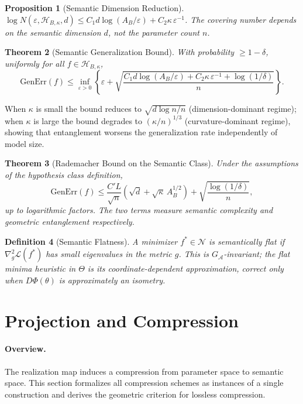 \documentclass[twocolumn,10pt]{article}
\theoremstyle{thmstyle}
\newtheorem{theorem}{Theorem}[section]
\newtheorem{proposition}[theorem]{Proposition}
\theoremstyle{defstyle}
\newtheorem{definition}[theorem]{Definition}
\begin{document}
\begin{proposition}[Semantic Dimension Reduction]
$\log N(\varepsilon,\mathcal{H}_{B,\kappa},d) \leq
C_1 d\log(A_B/\varepsilon) + C_2\kappa\,\varepsilon^{-1}$.
The covering number depends on the semantic dimension $d$, not the
parameter count $n$.
\end{proposition}

\begin{theorem}[Semantic Generalization Bound]
With probability $\geq 1-\delta$, uniformly for all
$f \in \mathcal{H}_{B,\kappa}$,
\[
\mathrm{GenErr}(f) \leq \inf_{\varepsilon>0}\!\left\{
\varepsilon + \sqrt{\frac{C_1 d\log(A_B/\varepsilon)
+ C_2\kappa\,\varepsilon^{-1} + \log(1/\delta)}{n}}
\right\}.
\]
\end{theorem}

When $\kappa$ is small the bound reduces to $\sqrt{d\log n/n}$
(dimension-dominant regime); when $\kappa$ is large the bound degrades
to $(\kappa/n)^{1/3}$ (curvature-dominant regime), showing that
entanglement worsens the generalization rate independently of model
size.

\begin{theorem}[Rademacher Bound on the Semantic Class]
Under the assumptions of the hypothesis class definition,
\[
\mathrm{GenErr}(f) \leq
\frac{C'L}{\sqrt{n}}\!\left(\sqrt{d}
+ \sqrt{\kappa}\,A_B^{1/2}\right)
+ \sqrt{\frac{\log(1/\delta)}{n}},
\]
up to logarithmic factors. The two terms measure semantic complexity
and geometric entanglement respectively.
\end{theorem}

\begin{definition}[Semantic Flatness]
A minimizer $f^* \in \mathcal{N}$ is \emph{semantically flat} if
$\nabla^2_g\mathcal{L}(f^*)$ has small eigenvalues in the metric $g$.
This is $G_\mathcal{A}$-invariant; the flat minima heuristic in $\Theta$
is its coordinate-dependent approximation, correct only when $D\Phi(\theta)$
is approximately an isometry.
\end{definition}

\section{Projection and Compression}
\label{sec:compression}

\paragraph{Overview.}
The realization map induces a compression from parameter space to
semantic space. This section formalizes all compression schemes as
instances of a single construction and derives the geometric criterion
for lossless compression.
\end{document}
